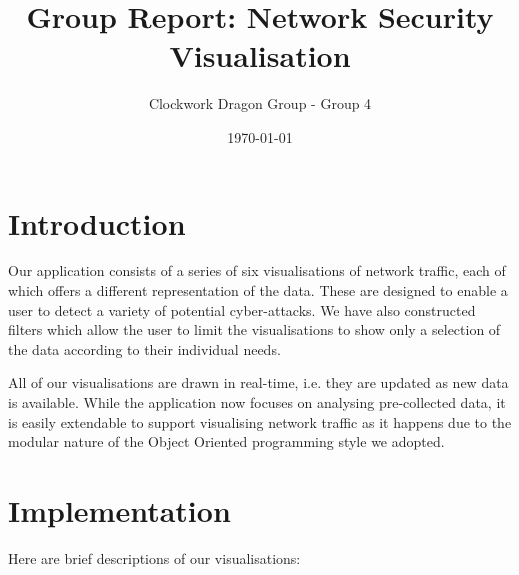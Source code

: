 \documentclass[12pt,a4paper]{article}
\author{Clockwork Dragon Group - Group 4}
\title{Group Report: Network Security Visualisation}
\date{\today}
\begin{document}
	
	\maketitle

    \section*{Introduction}
	Our application consists of a series of six visualisations of network traffic, each of which offers a different representation of the data. These are designed to enable a user to detect a variety of potential cyber-attacks. 
			We have also constructed filters which allow the user to limit the visualisations to show only a selection of the data according to their individual needs. 
			
			All of our visualisations are drawn in real-time, i.e. they are updated as new data is available. While the application now focuses on analysing pre-collected data, it is easily extendable to support visualising network traffic as it happens due to the modular nature of the Object Oriented programming style we adopted.

    \section*{Implementation}
			Here are brief descriptions of our visualisations:
			
\end{document}
